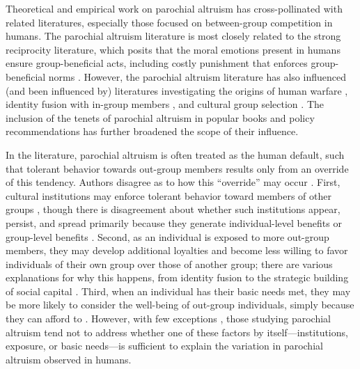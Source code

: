 \documentclass[bibauthoryear]{aa}
\begin{document}
Theoretical and empirical work on parochial altruism has cross-pollinated with related literatures, especially those focused on between-group competition in humans. The parochial altruism literature is most closely related to the strong reciprocity literature, which posits that the moral emotions present in humans ensure group-beneficial acts, including costly punishment that enforces group-beneficial norms \citep{fehr2002strong, fehr2003strong, gintis2008strong}. However, the parochial altruism literature has also influenced (and been influenced by) literatures investigating the origins of human warfare \citep{glowacki2017evolutionary, wrangham2012intergroup, zefferman2015evolutionary}, identity fusion with in-group members \citep{swann2012group,  purzycki2019identity}, and cultural group selection \citep{richerson2016cultural}. The inclusion of the tenets of parochial altruism in popular books \citep{seabright2004company, greene2013moral} and policy recommendations \citep{choi2019parochialism, waring2015} has further broadened the scope of their influence.

In the literature, parochial altruism is often treated as the human default, such that tolerant behavior towards out-group members results only from an override of this tendency. %
 Authors disagree as to how this ``override'' may occur \citep{pisor2019evolution}. First, cultural institutions may enforce tolerant behavior toward members of other groups \citep{fearon1996explaining, fry2018evolutionary}, though there is disagreement about whether such institutions appear, persist, and spread primarily because they generate individual-level benefits or group-level benefits \citep[see][for a useful discussion]{purzycki2020institutions}. Second, as an individual is exposed to more out-group members, they may develop additional loyalties and become less willing to favor individuals of their own group over those of another group; there are various explanations for why this happens, from identity fusion to the strategic building of social capital \citep{brewer1976ethnocentrism, beck2006cosmopolitan, buchan2009globalization, fukuyama2001social, hruschka2013economic, mau2008cosmopolitan, singer2011expanding}. Third, when an individual has their basic needs met, they may be more likely to consider the well-being of out-group individuals, simply because they can afford to \citep{hruschka2014impartial, silva2014cooperation}. However, with few exceptions \citep{hruschka2013economic, vardy2019property}, those studying parochial altruism tend not to address whether one of these factors by itself---institutions, exposure, or basic needs---is sufficient to explain the variation in parochial altruism observed in humans.
\end{document}
